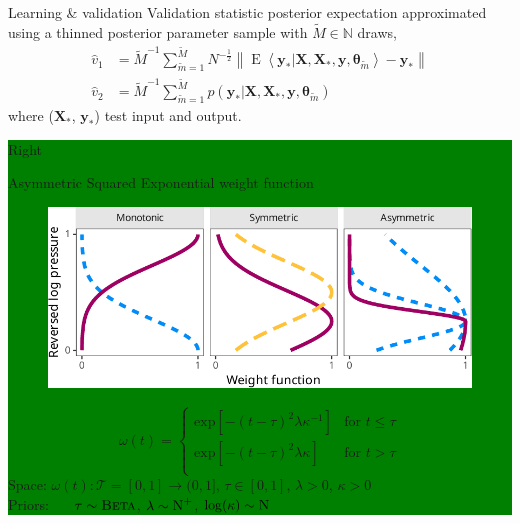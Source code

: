 \documentclass[final]{beamer}
\newcommand{\norm}[1]{\left\lVert#1\right\rVert}
\DeclareMathOperator{\evsym}{E}
\newcommand\EE[1]{\evsym\left\langle#1\right\rangle}
\begin{document}
\begin{frame}[t]
{\begin{minipage}[t][76cm][t]{58cm}
{\begin{minipage}[t][40cm][t]{28cm}
\begin{block}{Learning \& validation}
            Validation statistic posterior expectation approximated using a thinned
            posterior parameter sample with $\tilde{M} \in \mathbb{N}$ draws,
            \begin{align}
              \hat{v}_1
              &= {\tilde{M}}^{-1} \sum_{{\tilde{m}}=1}^{{\tilde{M}}} N^{-\frac{1}{2}} \norm{%
                \EE{\bm{y}_{*} | \bm{X}, \bm{X}_{*}, \bm{y}, {\bm{\theta}}_{{\tilde{m}}}} -
                \bm{y}_{*}
                } \label{eq:validation-rmse} \\
              \hat{v}_2
              &= {\tilde{M}}^{-1} \sum_{{\tilde{m}}=1}^{{\tilde{M}}}
                p(\bm{y}_{*} | \bm{X}, \bm{X}_{*}, \bm{y},
                {\bm{\theta}}_{{\tilde{m}}}) \label{eq:validation-ppld}
            \end{align}
            where ($\mathbf{X}_\mathbf{*}$, $\mathbf{y}_\mathbf{*}$) test input and output.
          \end{block}
        \end{minipage}
      }
      \colorbox{green}{
        \begin{minipage}[t][40cm][t]{28cm}
          Right
          \begin{block}{Asymmetric Squared Exponential weight function}
            \begin{figure}
              \centering
              \includegraphics[width=.85\linewidth]{inc/coda_weight_profiles_fsc040}
            \end{figure}
            \begin{equation}
              \label{eq:weight-ase}
              \omega(t)
              =
              \begin{cases}
                \text{exp}\left[- {(t - \tau)}^2 \lambda\kappa^{-1}
                \right] & \text{for } t \le \tau \\
                \text{exp}\left[- {(t - \tau)}^2 \lambda\kappa
                \right] & \text{for } t > \tau \\
              \end{cases}
            \end{equation}
            Space:
            $\omega(t): \mathcal{T} = [0, 1] \to (0, 1]$,
            $\tau\in[0,1]$,
            $\lambda > 0$,
            $\kappa > 0$ \\
            Priors:
            $\indent\tau \sim \textsc{Beta}$,
            $\lambda \sim \textsc{N}^{+}$,
            $\log(\kappa) \sim \textsc{N}$
          \end{block}


\end{minipage}}
\end{minipage}}
\end{frame}
\end{document}
